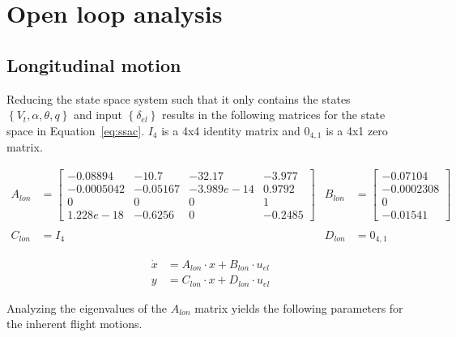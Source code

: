 \section{Open loop analysis}
\subsection{Longitudinal motion}
Reducing the state space system such that it only contains the states $\left \{ V_t, \alpha, \theta, q \right \}$ and input $\left \{ \delta_{el} \right \}$ results in the following matrices for the state space in Equation~\ref{eq:ssac}. $I_4$ is a 4x4 identity matrix and $0_{4,1}$ is a 4x1 zero matrix.

\begin{equation}
    \label{eq:sslon}
    \begin{aligned}
        A_{lon}&=\begin{bmatrix}
            -0.08894   &  -10.7   &   -32.17   & -3.977 \\
            -0.0005042 & -0.05167 & -3.989e-14 &   0.9792 \\
                    0 &        0 &          0 &        1 \\
            1.228e-18 &  -0.6256 &          0 &  -0.2485
        \end{bmatrix} &
        B_{lon}&=\begin{bmatrix}
            -0.07104 \\
            -0.0002308 \\
                    0 \\
            -0.01541 
        \end{bmatrix} \\\\
        C_{lon}&=I_4 &
        D_{lon}&=0_{4,1}
    \end{aligned}
\end{equation}

\begin{align}    
    \dot{x} &= A_{lon} \cdot x + B_{lon} \cdot u_{el} \nonumber\\
    y &= C_{lon} \cdot x + D_{lon} \cdot u_{el} \label{eq:ssac}
\end{align}

Analyzing the eigenvalues of the $A_{lon}$ matrix yields the following parameters for the inherent flight motions.

